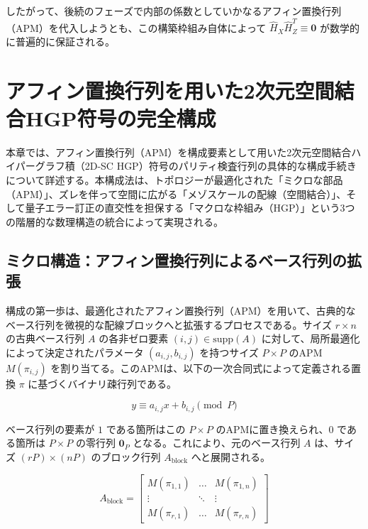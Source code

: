 \documentclass[12pt]{article}
\begin{document}
したがって、後続のフェーズで内部の係数としていかなるアフィン置換行列（APM）を代入しようとも、この構築枠組み自体によって $\hat{H}_X \hat{H}_Z^T \equiv \mathbf{0}$ が数学的に普遍的に保証される。

\section{アフィン置換行列を用いた2次元空間結合HGP符号の完全構成}

本章では、アフィン置換行列（APM）を構成要素として用いた2次元空間結合ハイパーグラフ積（2D-SC HGP）符号のパリティ検査行列の具体的な構成手続きについて詳述する。本構成法は、トポロジーが最適化された「ミクロな部品（APM）」、ズレを伴って空間に広がる「メゾスケールの配線（空間結合）」、そして量子エラー訂正の直交性を担保する「マクロな枠組み（HGP）」という3つの階層的な数理構造の統合によって実現される。

\subsection{ミクロ構造：アフィン置換行列によるベース行列の拡張}

構成の第一歩は、最適化されたアフィン置換行列（APM）を用いて、古典的なベース行列を微視的な配線ブロックへと拡張するプロセスである。サイズ $r \times n$ の古典ベース行列 $A$ の各非ゼロ要素 $(i, j) \in \text{supp}(A)$ に対して、局所最適化によって決定されたパラメータ $(a_{i,j}, b_{i,j})$ を持つサイズ $P \times P$ のAPM $M(\pi_{i,j})$ を割り当てる。このAPMは、以下の一次合同式によって定義される置換 $\pi$ に基づくバイナリ疎行列である。

\begin{equation}
    y \equiv a_{i,j} x + b_{i,j} \pmod P
\end{equation}

ベース行列の要素が $1$ である箇所はこの $P \times P$ のAPMに置き換えられ、$0$ である箇所は $P \times P$ の零行列 $\mathbf{0}_P$ となる。これにより、元のベース行列 $A$ は、サイズ $(rP) \times (nP)$ のブロック行列 $A_{\text{block}}$ へと展開される。

\begin{equation}
    A_{\text{block}} = \begin{bmatrix} M(\pi_{1,1}) & \dots & M(\pi_{1,n}) \\ \vdots & \ddots & \vdots \\ M(\pi_{r,1}) & \dots & M(\pi_{r,n}) \end{bmatrix}
\end{equation}
\end{document}
